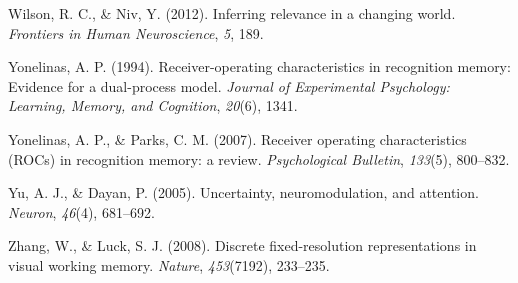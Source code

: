 \documentclass[
  english,
  ,man,floatsintext]{apa6}
\begin{document}
\leavevmode\hypertarget{ref-WilsonAndNiv2012}{}%
Wilson, R. C., \& Niv, Y. (2012). Inferring relevance in a changing world. \emph{Frontiers in Human Neuroscience}, \emph{5}, 189.

\leavevmode\hypertarget{ref-yonelinas1994receiver}{}%
Yonelinas, A. P. (1994). Receiver-operating characteristics in recognition memory: Evidence for a dual-process model. \emph{Journal of Experimental Psychology: Learning, Memory, and Cognition}, \emph{20}(6), 1341.

\leavevmode\hypertarget{ref-YonelinasAndParks2007}{}%
Yonelinas, A. P., \& Parks, C. M. (2007). Receiver operating characteristics (ROCs) in recognition memory: a review. \emph{Psychological Bulletin}, \emph{133}(5), 800--832.

\leavevmode\hypertarget{ref-YuAndDayan2005}{}%
Yu, A. J., \& Dayan, P. (2005). Uncertainty, neuromodulation, and attention. \emph{Neuron}, \emph{46}(4), 681--692.

\leavevmode\hypertarget{ref-zhang2008discrete}{}%
Zhang, W., \& Luck, S. J. (2008). Discrete fixed-resolution representations in visual working memory. \emph{Nature}, \emph{453}(7192), 233--235.
\end{document}
